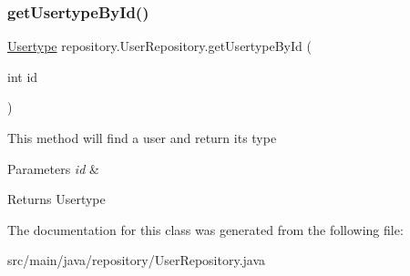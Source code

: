 \subsubsection{\texorpdfstring{get\+Usertype\+By\+Id()}{getUsertypeById()}}
{\footnotesize\ttfamily \mbox{\hyperlink{classentity_1_1_usertype}{Usertype}} repository.\+User\+Repository.\+get\+Usertype\+By\+Id (\begin{DoxyParamCaption}\item[{int}]{id }\end{DoxyParamCaption})\hspace{0.3cm}{\ttfamily [inline]}}

This method will find a user and return its type 
\begin{DoxyParams}{Parameters}
{\em id} & ~\newline
\\
\hline
\end{DoxyParams}
\begin{DoxyReturn}{Returns}
Usertype 
\end{DoxyReturn}


The documentation for this class was generated from the following file\+:\begin{DoxyCompactItemize}
\item 
src/main/java/repository/User\+Repository.\+java\end{DoxyCompactItemize}
